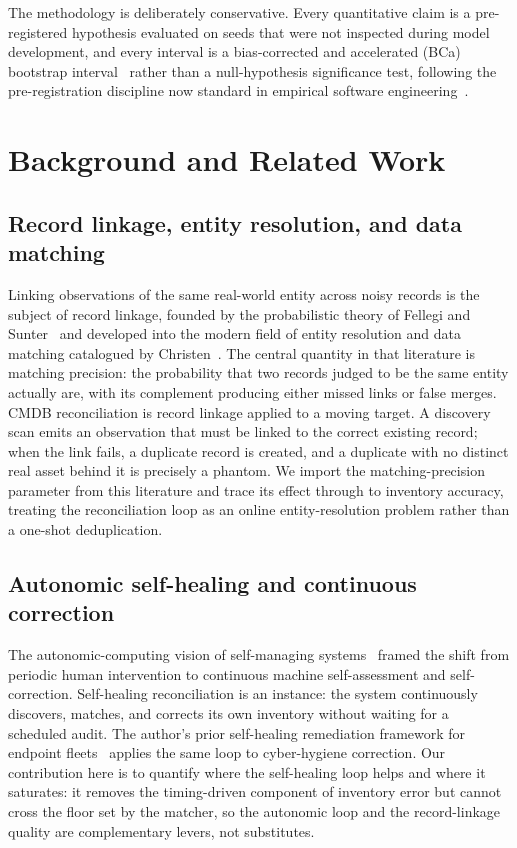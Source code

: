 \documentclass[journal]{IEEEtran}
\begin{document}
The methodology is deliberately conservative. Every quantitative claim is a pre-registered
hypothesis evaluated on seeds that were not inspected during model development, and every interval is
a bias-corrected and accelerated (BCa) bootstrap interval~\cite{efron1987bca,efron1994introduction}
rather than a null-hypothesis significance test, following the pre-registration discipline now
standard in empirical software engineering~\cite{wohlin2012experimentation}.

\section{Background and Related Work}

\subsection{Record linkage, entity resolution, and data matching}
Linking observations of the same real-world entity across noisy records is the subject of record
linkage, founded by the probabilistic theory of Fellegi and Sunter~\cite{fellegi1969linkage} and
developed into the modern field of entity resolution and data matching catalogued by
Christen~\cite{christen2012matching}. The central quantity in that literature is matching precision:
the probability that two records judged to be the same entity actually are, with its complement
producing either missed links or false merges. CMDB reconciliation is record linkage applied to a
moving target. A discovery scan emits an observation that must be linked to the correct existing
record; when the link fails, a duplicate record is created, and a duplicate with no distinct real
asset behind it is precisely a phantom. We import the matching-precision parameter from this
literature and trace its effect through to inventory accuracy, treating the reconciliation loop as an
online entity-resolution problem rather than a one-shot deduplication.

\subsection{Autonomic self-healing and continuous correction}
The autonomic-computing vision of self-managing systems~\cite{kephart2003vision} framed the shift
from periodic human intervention to continuous machine self-assessment and self-correction.
Self-healing reconciliation is an instance: the system continuously discovers, matches, and corrects
its own inventory without waiting for a scheduled audit. The author's prior self-healing remediation
framework for endpoint fleets~\cite{paper10autoheal} applies the same loop to cyber-hygiene
correction. Our contribution here is to quantify where the self-healing loop helps and where it
saturates: it removes the timing-driven component of inventory error but cannot cross the floor set
by the matcher, so the autonomic loop and the record-linkage quality are complementary levers, not
substitutes.
\end{document}
